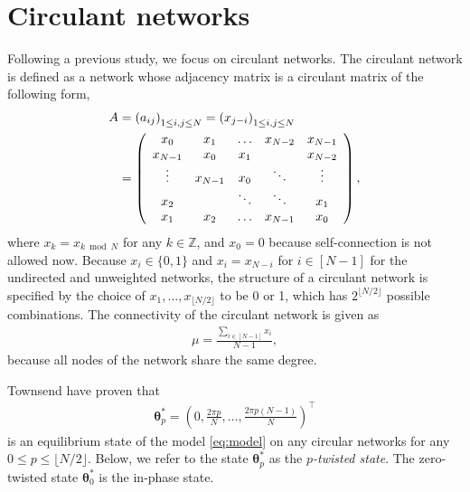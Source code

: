 \section{Circulant networks}
\label{sec:circulant}
Following a previous study\cite{townsend2020}, we focus on circulant networks. The circulant network is defined as a network whose adjacency matrix is a circulant matrix of the following form,
\begin{align}
A &= \left(a_{ij}\right)_{1\leq i,j\leq N}=\left(x_{j-i}\right)_{1\leq i,j\leq N}\notag\\
&=\left(
\begin{array}{ccccc}
    x_{0} & x_{1} & \dots & x_{N-2} & x_{N-1}\\
    x_{N-1} & x_{0} & x_{1} &  & x_{N-2}\\
    \vdots & x_{N-1} & x_{0} & \ddots & \vdots\\
    x_{2} &  & \ddots & \ddots & x_{1}\\
    x_{1} & x_{2} & \dots & x_{N-1} & x_{0}
\end{array}
\right),\label{eq:adjacency-mat}
\end{align}
where $x_{k} = x_{k\bmod N}$ for any $k\in\mathbb{Z}$, and $x_{0}=0$ because self-connection is not allowed now. Because $x_{i}\in\{0,1\}$ and $x_{i} = x_{N-i}$ for $i\in[N-1]$ for the undirected and unweighted networks, the structure of a circulant network is specified by the choice of $x_{1},\dots,x_{\lfloor N/2\rfloor}$ to be 0 or 1, which has $2^{\lfloor N/2\rfloor}$ possible combinations. The connectivity of the circulant network is given as
\begin{align}
    \mu=\frac{\sum_{i\in[N-1]}x_{i}}{N-1},
    \label{eq:mu}
\end{align}
because all nodes of the network share the same degree.

Townsend \etal have proven that
\begin{align}
    \bm{\theta}_{p}^{\ast} = \left(0,\frac{2\pi p}{N},\dots,\frac{2\pi p(N-1)}{N}\right)^{\top}
\end{align}
is an equilibrium state of the model \eqref{eq:model} on any circular networks for any $0\leq p\leq\lfloor N/2\rfloor$. Below, we refer to the state $\bm{\theta}_{p}^{\ast}$ as the $p$\textit{-twisted state}. The zero-twisted state $\bm{\theta}_{0}^{\ast}$ is the in-phase state.

